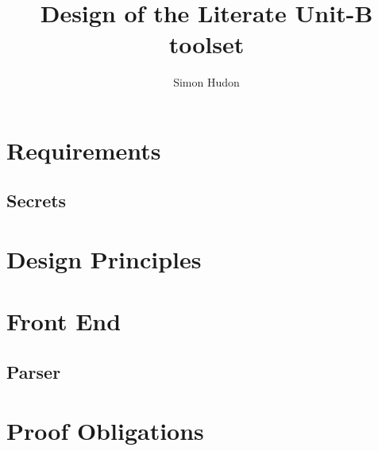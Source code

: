 \documentclass[12pt]{amsart}
\title{Design of the Literate Unit-B toolset}
\author{Simon Hudon}
\date{} %
\begin{document}
\maketitle
\tableofcontents

\section{Requirements}
\subsection{Secrets}
\section{Design Principles}
\section{Front End}


\subsection{Parser}
\section{Proof Obligations}


\end{document}
